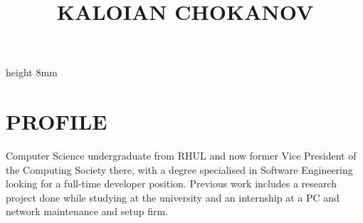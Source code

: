 \documentclass{CVClass}
\begin{document}
\begin{minipage}[t][4cm]{0.70\textwidth} 
    \title[Graduating Software Engineer]{KALOIAN CHOKANOV}
\end{minipage}
\quad
\vline height 8mm 
\quad
\begin{minipage}[t][4cm]{0.30\textwidth}
    \address{   %
        404 Monastery Street,\\
        Geo Milev,\\
        Sofia,\\
        1111
        }
\end{minipage}
\vskip2mm

\begin{minipage}[t][2cm]{0.75\textwidth}
    \section{PROFILE}{
		Computer Science undergraduate from RHUL and now former Vice President of the Computing Society there, with a degree specialised in Software Engineering looking for a full-time developer position. Previous work includes a research project done while studying at the university and an internship at a PC and network maintenance and setup firm.
	}
\end{minipage}
\vskip5mm
\end{document}
